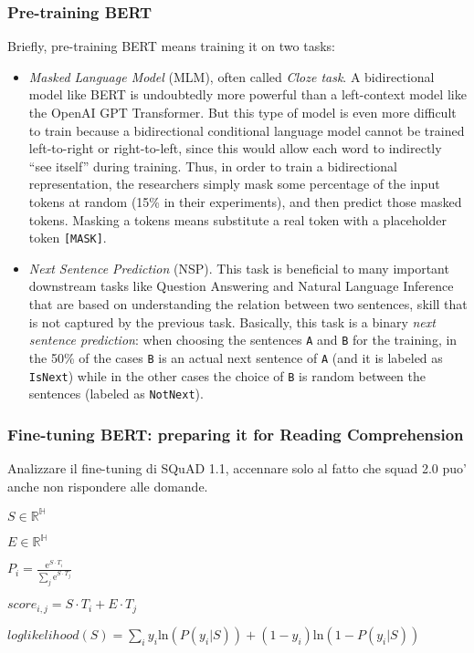 \subsubsection{Pre-training BERT}
Briefly, pre-training BERT means training it on two tasks:
\begin{itemize}
  \item \textit{Masked Language Model} (MLM), often called \textit{Cloze task}. A bidirectional model like BERT is undoubtedly more powerful than a left-context model like the OpenAI GPT Transformer. But this type of model is even more difficult to train because a bidirectional conditional language model cannot be trained left-to-right or right-to-left, since this would allow each word to indirectly “see itself” during training. Thus, in order to train a bidirectional representation, the researchers simply mask some percentage of the input tokens at random (15\% in their experiments), and then predict those masked tokens. Masking a tokens means substitute a real token with a placeholder token \texttt{[MASK]}. 
  \item \textit{Next Sentence Prediction} (NSP). This task is beneficial to many important downstream tasks like Question Answering and Natural Language Inference that are based on understanding the relation between two sentences, skill that is not captured by the previous task. Basically, this task is a binary \textit{next sentence prediction}: when choosing the sentences \texttt{A} and \texttt{B} for the training, in the 50\% of the cases \texttt{B} is an actual next sentence of \texttt{A} (and it is labeled as \texttt{IsNext}) while in the other cases the choice of \texttt{B} is random between the sentences (labeled as \texttt{NotNext}).
\end{itemize}

\subsubsection{Fine-tuning BERT: preparing it for Reading Comprehension}

Analizzare il fine-tuning di SQuAD 1.1, accennare solo al fatto che squad 2.0 puo' anche non rispondere alle domande.

$S \in \mathbb{R}^\mathbb{H}$

$E \in \mathbb{R}^\mathbb{H}$

$P_{i} = \frac{\mathrm{e}^{S \cdot T_{i}}}{\sum_{j} \mathrm{e}^{S \cdot T_{j}}}$

$score_{i, j} = S \cdot T_{i} + E \cdot T_{j}$


$loglikelihood(S) = \sum_{i} y_{i} \mathrm{ln} (P(y_{i} | S)) + (1 - y_{i}) \mathrm{ln} (1 - P(y_{i} | S))$